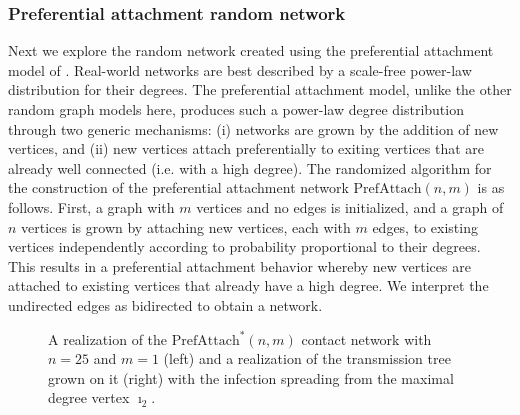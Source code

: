\documentclass[review]{elsarticle}
\numberwithin{equation}{section}
\begin{document}

\subsubsection{Preferential attachment random network}

Next we explore the random network created using the preferential attachment model of \cite{Barabasi1999}.  
Real-world networks are best described by a scale-free power-law distribution for their degrees. 
The preferential attachment model, unlike the other random graph models here, produces such a power-law degree distribution through two generic mechanisms: (i) networks are grown by the addition of new vertices, and (ii) new vertices attach preferentially to exiting vertices that are already well connected (i.e. with a high degree). 
The randomized algorithm for the construction of the preferential attachment network $\mathrm{PrefAttach}(n,m)$ is as follows.  
First, a graph with $m$ vertices and no edges is initialized, and a graph of $n$ vertices is grown by attaching new vertices, each with $m$ edges, 
to existing vertices independently according to probability proportional to their degrees.  
This results in a preferential attachment behavior whereby new vertices are attached to existing vertices that already have a high degree.  
We interpret the undirected edges as bidirected to obtain a network.  

\begin{figure}[htbp]
\begin{center}
{\scalebox{0.95}{

}}
\end{center}
\caption{A realization of the $\mathrm{PrefAttach}^*(n,m)$ contact network with $n=25$ and $m=1$ (left) and a realization of the transmission tree grown on it (right) with the infection spreading from the maximal degree vertex $\imath_2$.\label{F:prefAttach_n25m1}}
\end{figure}
\end{document}
